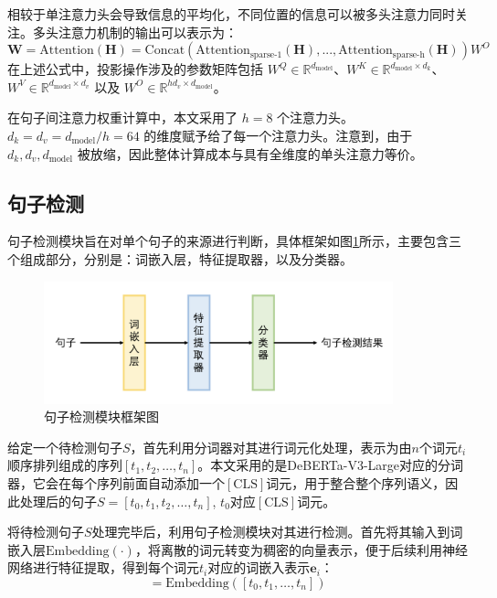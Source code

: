 相较于单注意力头会导致信息的平均化，不同位置的信息可以被多头注意力同时关注。多头注意力机制的输出可以表示为：
\begin{equation}
\textbf{W} = \text{Attention}(\textbf{H}) = \text{Concat} \left(\text{Attention}_\text{sparse-1}(\textbf{H}), ..., \text{Attention}_\text{sparse-h}(\textbf{H}) \right)W^O
\label{eq3.2}
\end{equation}
在上述公式中，投影操作涉及的参数矩阵包括 \(W^Q \in \mathbb{R}^{d_{\text{model}}}\)、\(W^K \in \mathbb{R}^{d_{\text{model}} \times d_k}\)、\(W^V \in \mathbb{R}^{d_{\text{model}} \times d_v}\) 以及 \(W^O \in \mathbb{R}^{hd_v \times d_{\text{model}}}\)。

在句子间注意力权重计算中，本文采用了 \(h = 8\) 个注意力头。\(d_k = d_v = d_{\text{model}} / h = 64\) 的维度赋予给了每一个注意力头。注意到，由于 \(d_k, d_v, d_{\text{model}} \) 被放缩，因此整体计算成本与具有全维度的单头注意力等价。

\subsection{句子检测}

句子检测模块旨在对单个句子的来源进行判断，具体框架如图\ref{fig:sentence-classifier}所示，主要包含三个组成部分，分别是：词嵌入层，特征提取器，以及分类器。

\begin{figure}[htbp]
    \centering
    \includegraphics[width=0.9\textwidth]{figures/sentence-classifier.png}
    \caption{句子检测模块框架图}
    \label{fig:sentence-classifier}
\end{figure}

给定一个待检测句子$S$，首先利用分词器对其进行词元化处理，表示为由$n$个词元$t_{i}$顺序排列组成的序列$[t_{1}, t_{2}, \ldots, t_{n}]$。本文采用的是DeBERTa-V3-Large对应的分词器，它会在每个序列前面自动添加一个$[\mathrm{CLS}]$词元，用于整合整个序列语义，因此处理后的句子$S=[t_{0}, t_{1}, t_{2}, \ldots, t_{n}]$, $t_{0}$对应$[\mathrm{CLS}]$词元。

将待检测句子$S$处理完毕后，利用句子检测模块对其进行检测。首先将其输入到词嵌入层$\mathrm{Embedding}(\cdot)$，将离散的词元转变为稠密的向量表示，便于后续利用神经网络进行特征提取，得到每个词元$t_{i}$对应的词嵌入表示$\mathbf{e}_{i}$：
\begin{equation}
    [\mathbf{e}_{0}, \mathbf{e}_{1}, \ldots, \mathbf{e}_{n}]=\mathrm{Embedding}([t_{0}, t_{1}, \ldots, t_{n}])
\end{equation}

